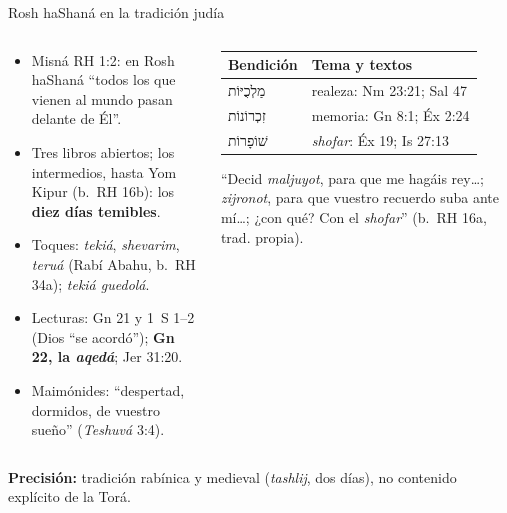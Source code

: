 \documentclass[hyperref={bookmarks=false},aspectratio=169]{beamer}
\newcommand{\heb}[1]{\mbox{\foreignlanguage{hebrew}{#1}}}
\newcommand{\destacar}[1]{\textbf{\textcolor{tierraroja}{#1}}}
\newcommand{\precision}[1]{{\footnotesize\color{sepia}\textbf{Precisión:} #1}}
\begin{document}
\begin{frame}{Rosh haShaná en la tradición judía}
\begin{columns}[t,onlytextwidth]
\begin{column}{0.50\textwidth}\scriptsize\RaggedRight
\begin{itemize}
\item Misná RH 1:2: en Rosh haShaná ``todos los que vienen al mundo pasan delante de Él''.
\item Tres libros abiertos; los intermedios, hasta Yom Kipur (b.~RH 16b): los \destacar{diez días temibles}.
\item Toques: \emph{tekiá}, \emph{shevarim}, \emph{teruá} (Rabí Abahu, b.~RH 34a); \emph{tekiá guedolá}.
\item Lecturas: Gn 21 y 1~S 1--2 (Dios ``se acordó''); \destacar{Gn 22, la \emph{aqedá}}; Jer 31:20.
\item Maimónides: ``despertad, dormidos, de vuestro sueño'' (\emph{Teshuvá} 3:4).
\end{itemize}
\end{column}
\begin{column}{0.48\textwidth}
\scriptsize\renewcommand{\arraystretch}{1.12}
\begin{tabular}{@{}L{1.7cm}L{3.5cm}@{}}
\toprule
\textbf{Bendición} & \textbf{Tema y textos} \\ \midrule
\heb{מַלְכֻיּוֹת} & realeza: Nm 23:21; Sal 47 \\
\heb{זִכְרוֹנוֹת} & memoria: Gn 8:1; Éx 2:24 \\
\heb{שׁוֹפָרוֹת} & \emph{shofar}: Éx 19; Is 27:13 \\
\bottomrule
\end{tabular}\par\smallskip
{\fontsize{6}{7}\selectfont ``Decid \emph{maljuyot}, para que me hagáis rey\ldots; \emph{zijronot}, para que vuestro recuerdo suba ante mí\ldots; ¿con qué? Con el \emph{shofar}'' (b.~RH 16a, trad. propia).}
\end{column}
\end{columns}\par\smallskip
\precision{tradición rabínica y medieval (\emph{tashlij}, dos días), no contenido explícito de la Torá.}
\end{frame}
\end{document}
